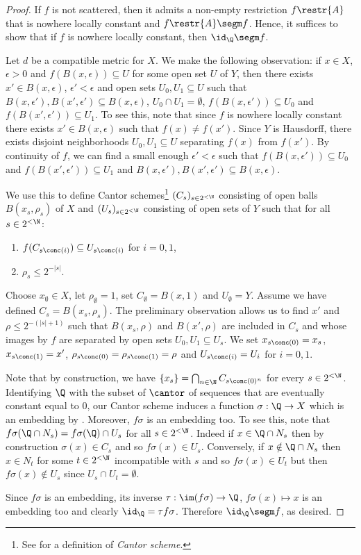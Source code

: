 \begin{proof}
If $f$ is not scattered, then it admits a non-empty restriction $f\restr{A}$ that is nowhere locally constant and $f\restr{A}\segm f$.
Hence, it suffices to show that if $f$ is nowhere locally constant, then $\id_\Q\segm  f$.

Let $d$ be a compatible metric for $X$.
We make the following observation: if $x\in X$, $\epsilon>0$ and $f(B(x,\epsilon))\subseteq U$ for some open set $U$ of $Y$,
then there exists $x'\in B(x,\epsilon)$, $\epsilon'<\epsilon$ and open sets $U_0,U_1\subseteq U$ such that $B(x,\epsilon'),B(x',\epsilon')\subseteq B(x,\epsilon)$,
$U_0\cap U_1=\emptyset$, $f(B(x,\epsilon'))\subseteq U_0$ and $f(B(x',\epsilon'))\subseteq U_1$.
To see this, note that since $f$ is nowhere locally constant there exists $x'\in B(x,\epsilon)$ such that $f(x)\neq f(x')$.
Since $Y$ is Hausdorff, there exists disjoint neighborhoods $U_0,U_1\subseteq U$ separating $f(x)$ from $f(x')$.
By continuity of $f$, we can find a small enough $\epsilon'<\epsilon$ such that $f(B(x,\epsilon'))\subseteq U_0$ and $f(B(x',\epsilon'))\subseteq U_1$ and $B(x,\epsilon'), B(x',\epsilon')\subseteq B(x,\epsilon)$.

We use this to define Cantor schemes\footnote{See \cite[Definition 6.1]{kechris} for a definition of \emph{Cantor scheme}.}
$(C_s)_{s\in 2^{<\N}}$ consisting of open balls $B(x_s, \rho_s)$ of $X$ and $(U_s)_{s\in 2^{<\N}}$ consisting of open sets of $Y$ such that for all $s\in 2^{<\N}$:
\begin{enumerate}
\item $f(C_{s\conc(i)})\subseteq U_{s\conc(i)}$ for $i=0,1$,
\item $\rho_s\leq 2^{-|s|}$.
\end{enumerate}
Choose $x_\emptyset\in X$, let $\rho_\emptyset=1$, set $C_\emptyset=B(x,1)$ and $U_\emptyset=Y$. Assume we have defined $C_s=B(x_s, \rho_s)$.
The preliminary observation allows us to find $x'$ and $\rho\leq 2^{-(|s|+1)}$ such that $B(x_s,\rho)$ and $B(x',\rho)$ are included in $C_s$ and whose images by $f$ are separated by open sets $U_0,U_1\subseteq U_s$.
We set $x_{s\conc(0)}=x_s$, $x_{s\conc(1)}=x'$, $\rho_{s\conc(0)}=\rho_{s\conc(1)}=\rho$ and $U_{s\conc (i)}=U_i$ for $i=0,1$. 

Note that by construction, we have $\{x_{s}\}= \bigcap_{n\in\N}C_{s\conc (0)^n}$ for every $s\in 2^{<\N}$.
Identifying $\Q$ with the subset of $\cantor$ of sequences that are eventually constant equal to $0$, our Cantor scheme induces a function $\sigma:\Q\to X$ which is an embedding by \cite[(7.6)]{kechris}. 
Moreover, $f\sigma$ is an embedding too. 
To see this, note that $f\sigma(\Q\cap N_s)=f\sigma(\Q)\cap U_s$ for all $s\in 2^{<\N}$.
Indeed if $x\in \Q\cap N_s$ then by construction $\sigma(x)\in C_s$ and so $f\sigma(x)\in U_s$.
Conversely, if $x\notin \Q\cap N_s$ then $x\in N_t$ for some $t\in 2^{<\N}$ incompatible with $s$ and so $f\sigma(x)\in U_t$ but then $f\sigma(x)\notin U_s$ since $U_s\cap U_t=\emptyset$.

Since $f\sigma$ is an embedding, its inverse $\tau:\im (f\sigma)\to \Q$, $f\sigma(x)\mapsto x$ is an embedding too and clearly $\id_\Q=\tau f \sigma$. Therefore $\id_\Q\segm f$, as desired.
\end{proof}

